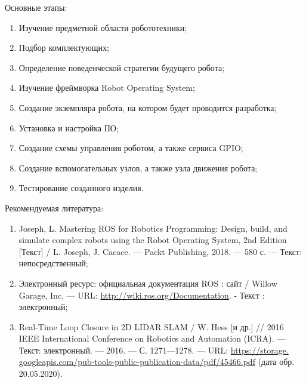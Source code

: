 \noindent Основные этапы:

\begin{enumerate}
	\item Изучение предметной области робототехники;
	\item Подбор комплектующих;
	\item Определение поведенческой стратегии будущего робота;
	\item Изучение фреймворка Robot Operating System;
	\item Создание экземпляра робота, на котором будет проводится разработка;
	\item Установка и настройка ПО;
	\item Создание схемы управления роботом, а также сервиса GPIO;
	\item Создание вспомогательных узлов, а также узла движения робота;
	\item Тестирование созданного изделия.
\end{enumerate}

\vspace{0.3cm}

\noindent Рекомендуемая литература:

\begin{enumerate}
	\item Joseph, L. Mastering ROS for Robotics Programming: Design, build, and simulate complex robots using the Robot Operating System, 2nd Edition [Текст] / L. Joseph, J. Cacace. — Packt Publishing, 2018. — 580 с. — Текст: непосредственный;
	
	\item Электронный ресурс: официальная документация ROS : сайт / Willow Garage, Inc. — URL: \url{http://wiki.ros.org/Documentation}. - Текст : электронный;
	
	\item Real-Time Loop Closure in 2D LIDAR SLAM / W. Hess [и др.] // 2016 IEEE International Conference on Robotics and Automation (ICRA). — Текст: электронный. — 2016. — С. 1271—1278. — URL: \url{https://storage. googleapis.com/pub-tools-public-publication-data/pdf/45466.pdf} (дата обр. 20.05.2020).
\end{enumerate}